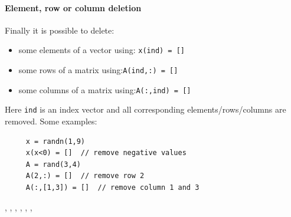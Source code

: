 \paragraph{Element, row or column deletion}

Finally it is possible to delete:
\begin{itemize}
\item some elements of a vector using: \verb+x(ind) = []+
\item some rows of a matrix using:\verb+A(ind,:) = []+  
\item some columns of a matrix using:\verb+A(:,ind) = []+ 
\end{itemize}
Here \verb+ind+ is an index vector and all corresponding elements/rows/columns are removed.
Some examples:
\begin{Verbatim}
     x = randn(1,9)
     x(x<0) = []  // remove negative values
     A = rand(3,4)
     A(2,:) = []  // remove row 2
     A(:,[1,3]) = []  // remove column 1 and 3
\end{Verbatim}




\begin{manseealso}
    , , , , , , 
\end{manseealso}
